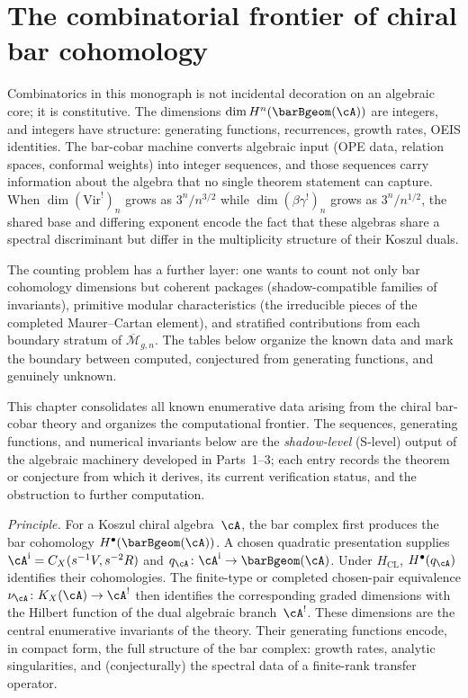 \chapter[Combinatorial frontier]{The combinatorial frontier of chiral bar cohomology}
\label{app:combinatorial-frontier}

Combinatorics in this monograph is not incidental decoration on an
algebraic core; it is constitutive. The dimensions
$\dim H^n(\barBgeom(\cA))$ are integers, and integers have structure:
generating functions, recurrences, growth rates, OEIS identities.
The bar-cobar machine converts algebraic input (OPE data, relation
spaces, conformal weights) into integer sequences, and those sequences
carry information about the algebra that no single theorem statement
can capture. When $\dim(\mathrm{Vir}^!)_n$ grows as $3^n/n^{3/2}$
while $\dim(\beta\gamma^!)_n$ grows as $3^n/n^{1/2}$, the shared
base and differing exponent encode the fact that these algebras share
a spectral discriminant but differ in the multiplicity structure of
their Koszul duals.

The counting problem has a further layer: one wants to count not only
bar cohomology dimensions but coherent packages (shadow-compatible
families of invariants), primitive modular characteristics (the
irreducible pieces of the completed Maurer--Cartan element), and
stratified contributions from each boundary stratum of
$\overline{\mathcal{M}}_{g,n}$. The tables below organize
the known data and mark the boundary between computed, conjectured
from generating functions, and genuinely unknown.

This chapter consolidates all known enumerative data arising from the chiral bar-cobar theory and organizes the computational frontier. The sequences, generating functions, and numerical invariants below are the \emph{shadow-level} (S-level) output of the algebraic machinery developed in Parts~1--3; each entry records the theorem or conjecture from which it derives, its current verification status, and the obstruction to further computation.

\medskip
\noindent\emph{Principle.}
For a Koszul chiral algebra~$\cA$, the bar complex first produces the
bar cohomology $H^\bullet(\barBgeom(\cA))$.  A chosen quadratic
presentation supplies
$\cA^{\mathrm i}=C_X(s^{-1}V,s^{-2}R)$ and
$q_\cA\colon\cA^{\mathrm i}\to\barBgeom(\cA)$.  Under
$H_{\mathrm{CL}}$, $H^\bullet(q_\cA)$ identifies their cohomologies.
The finite-type or completed chosen-pair equivalence
$\nu_\cA\colon K_X(\cA)\to\cA^!$ then identifies the corresponding
graded dimensions with the Hilbert function of the dual algebraic
branch~$\cA^!$.  These dimensions are the central enumerative
invariants of the theory. Their generating functions encode, in compact form, the
full structure of the bar complex: growth rates, analytic singularities,
and (conjecturally) the spectral data of a finite-rank transfer operator.

